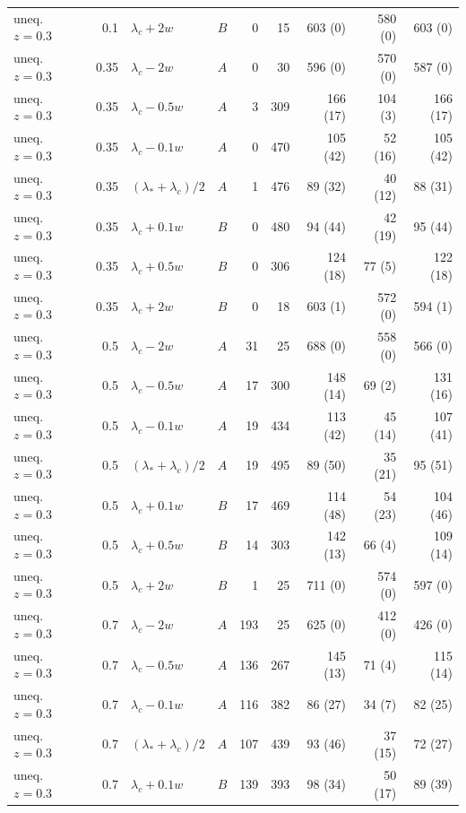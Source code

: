 \begin{longtable}{@{}lrllrrrrr@{}}
uneq. $z{=}0.3$ & 0.1 & $\lambda_c+2w$ & $B$ & 0 & 15 & 603 (0) & 580 (0) & 603 (0)\\
uneq. $z{=}0.3$ & 0.35 & $\lambda_c-2w$ & $A$ & 0 & 30 & 596 (0) & 570 (0) & 587 (0)\\
uneq. $z{=}0.3$ & 0.35 & $\lambda_c-0.5w$ & $A$ & 3 & 309 & 166 (17) & 104 (3) & 166 (17)\\
uneq. $z{=}0.3$ & 0.35 & $\lambda_c-0.1w$ & $A$ & 0 & 470 & 105 (42) & 52 (16) & 105 (42)\\
uneq. $z{=}0.3$ & 0.35 & $(\lambda_*+\lambda_c)/2$ & $A$ & 1 & 476 & 89 (32) & 40 (12) & 88 (31)\\
uneq. $z{=}0.3$ & 0.35 & $\lambda_c+0.1w$ & $B$ & 0 & 480 & 94 (44) & 42 (19) & 95 (44)\\
uneq. $z{=}0.3$ & 0.35 & $\lambda_c+0.5w$ & $B$ & 0 & 306 & 124 (18) & 77 (5) & 122 (18)\\
uneq. $z{=}0.3$ & 0.35 & $\lambda_c+2w$ & $B$ & 0 & 18 & 603 (1) & 572 (0) & 594 (1)\\
uneq. $z{=}0.3$ & 0.5 & $\lambda_c-2w$ & $A$ & 31 & 25 & 688 (0) & 558 (0) & 566 (0)\\
uneq. $z{=}0.3$ & 0.5 & $\lambda_c-0.5w$ & $A$ & 17 & 300 & 148 (14) & 69 (2) & 131 (16)\\
uneq. $z{=}0.3$ & 0.5 & $\lambda_c-0.1w$ & $A$ & 19 & 434 & 113 (42) & 45 (14) & 107 (41)\\
uneq. $z{=}0.3$ & 0.5 & $(\lambda_*+\lambda_c)/2$ & $A$ & 19 & 495 & 89 (50) & 35 (21) & 95 (51)\\
uneq. $z{=}0.3$ & 0.5 & $\lambda_c+0.1w$ & $B$ & 17 & 469 & 114 (48) & 54 (23) & 104 (46)\\
uneq. $z{=}0.3$ & 0.5 & $\lambda_c+0.5w$ & $B$ & 14 & 303 & 142 (13) & 66 (4) & 109 (14)\\
uneq. $z{=}0.3$ & 0.5 & $\lambda_c+2w$ & $B$ & 1 & 25 & 711 (0) & 574 (0) & 597 (0)\\
uneq. $z{=}0.3$ & 0.7 & $\lambda_c-2w$ & $A$ & 193 & 25 & 625 (0) & 412 (0) & 426 (0)\\
uneq. $z{=}0.3$ & 0.7 & $\lambda_c-0.5w$ & $A$ & 136 & 267 & 145 (13) & 71 (4) & 115 (14)\\
uneq. $z{=}0.3$ & 0.7 & $\lambda_c-0.1w$ & $A$ & 116 & 382 & 86 (27) & 34 (7) & 82 (25)\\
uneq. $z{=}0.3$ & 0.7 & $(\lambda_*+\lambda_c)/2$ & $A$ & 107 & 439 & 93 (46) & 37 (15) & 72 (27)\\
uneq. $z{=}0.3$ & 0.7 & $\lambda_c+0.1w$ & $B$ & 139 & 393 & 98 (34) & 50 (17) & 89 (39)\\

\end{longtable}
